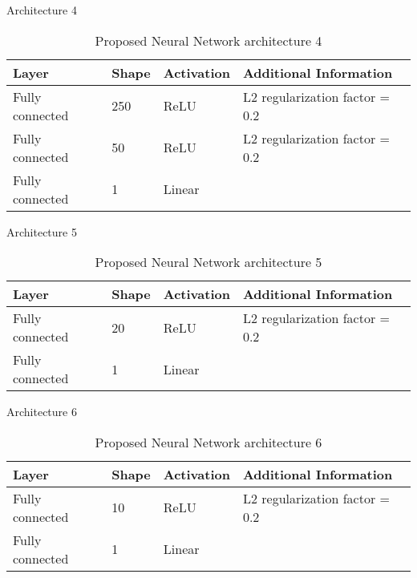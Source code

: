 Architecture 4

\begin{table}[!htb]
\centering
\begin{tabular}{l l l l}
	\hline
	Layer & Shape & Activation & Additional Information\\
  	\hline
  	Fully connected & 250 & ReLU & L2 regularization factor = 0.2\\
  	Fully connected & 50 & ReLU & L2 regularization factor = 0.2\\
  	Fully connected & 1 & Linear & \\
  	\hline
\end{tabular}
\caption{Proposed Neural Network architecture 4}
\label{table:proposed_nn_4}
\end{table}

Architecture 5

\begin{table}[!htb]
\centering
\begin{tabular}{l l l l}
	\hline
	Layer & Shape & Activation & Additional Information\\
  	\hline
  	Fully connected & 20 & ReLU & L2 regularization factor = 0.2\\
  	Fully connected & 1 & Linear & \\
  	\hline
\end{tabular}
\caption{Proposed Neural Network architecture 5}
\label{table:proposed_nn_5}
\end{table}

\pagebreak

Architecture 6

\begin{table}[!htb]
\centering
\begin{tabular}{l l l l}
	\hline
	Layer & Shape & Activation & Additional Information\\
  	\hline
  	Fully connected & 10 & ReLU & L2 regularization factor = 0.2\\
  	Fully connected & 1 & Linear & \\
  	\hline
\end{tabular}
\caption{Proposed Neural Network architecture 6}
\label{table:proposed_nn_6}
\end{table}